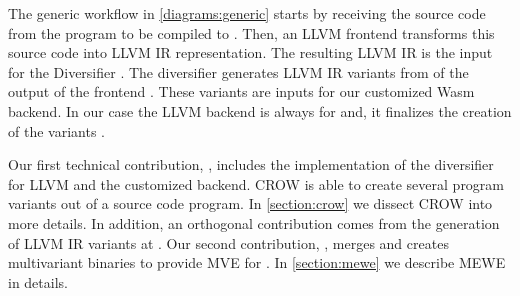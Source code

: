 The generic workflow in \autoref{diagrams:generic} starts by receiving the source code from the program to be compiled to \wasm. Then, an LLVM frontend transforms this source code into LLVM IR representation. The resulting LLVM IR is the input for the Diversifier .  
The diversifier generates LLVM IR variants from of the output of the frontend . These variants are inputs for our customized Wasm backend. In our case the LLVM backend is always for \wasm and, it finalizes the creation of the variants . 

Our first technical contribution,  \cite{CROW}, includes the implementation of the diversifier for LLVM and the customized \wasm backend. CROW is able to create several \wasm program variants out of a source code program. In \autoref{section:crow} we dissect CROW into more details.
In addition, an orthogonal contribution comes from the generation of LLVM IR variants at . Our second contribution,  \cite{MEWE}, merges and creates multivariant binaries to provide MVE for \wasm {}. In \autoref{section:mewe} we describe MEWE in details.

